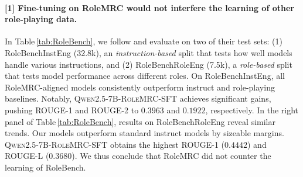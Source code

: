 \paragraph{[1] Fine-tuning on RoleMRC would not interfere the learning of other role-playing data.} In Table\,\ref{tab:RoleBench}, we follow \citet{wang2023rolellm} and evaluate on two of their test sets: (1) RoleBenchInstEng (32.8k), an \emph{instruction-based} split that tests how well models handle various instructions, and (2) RoleBenchRoleEng (7.5k), a \emph{role-based} split that tests model performance across different roles. %
On RoleBenchInstEng, all RoleMRC-aligned models consistently outperform instruct and role-playing baselines. Notably, \textsc{Qwen2.5-7B-RoleMRC-SFT} achieves significant gains, pushing ROUGE-1 and ROUGE-2 to $0.3963$ and $0.1922$, respectively. %
In the right panel of Table\,\ref{tab:RoleBench}, results on RoleBenchRoleEng reveal similar trends. Our models outperform standard instruct models by sizeable margins. \textsc{Qwen2.5-7B-RoleMRC-SFT} obtains the highest ROUGE-1 ($0.4442$) and ROUGE-L ($0.3680$). %
We thus conclude that RoleMRC did not counter the learning of RoleBench.

